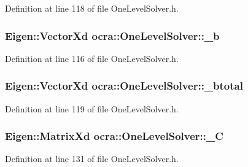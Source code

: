 Definition at line 118 of file One\+Level\+Solver.\+h.

\subsubsection[{\texorpdfstring{\+\_\+b}{_b}}]{\setlength{\rightskip}{0pt plus 5cm}Eigen\+::\+Vector\+Xd ocra\+::\+One\+Level\+Solver\+::\+\_\+b\hspace{0.3cm}{\ttfamily [protected]}}\hypertarget{classocra_1_1OneLevelSolver_a3c1c1c408757dad2c9f4256ceb7340d2}{}\label{classocra_1_1OneLevelSolver_a3c1c1c408757dad2c9f4256ceb7340d2}


Definition at line 116 of file One\+Level\+Solver.\+h.

\subsubsection[{\texorpdfstring{\+\_\+btotal}{_btotal}}]{\setlength{\rightskip}{0pt plus 5cm}Eigen\+::\+Vector\+Xd ocra\+::\+One\+Level\+Solver\+::\+\_\+btotal\hspace{0.3cm}{\ttfamily [protected]}}\hypertarget{classocra_1_1OneLevelSolver_a6ac65183fc93ea82d7e72fd4aae1422b}{}\label{classocra_1_1OneLevelSolver_a6ac65183fc93ea82d7e72fd4aae1422b}


Definition at line 119 of file One\+Level\+Solver.\+h.

\subsubsection[{\texorpdfstring{\+\_\+C}{_C}}]{\setlength{\rightskip}{0pt plus 5cm}Eigen\+::\+Matrix\+Xd ocra\+::\+One\+Level\+Solver\+::\+\_\+C\hspace{0.3cm}{\ttfamily [protected]}}\hypertarget{classocra_1_1OneLevelSolver_aad5ebd6a765da03c843c6d63539e6450}{}\label{classocra_1_1OneLevelSolver_aad5ebd6a765da03c843c6d63539e6450}


Definition at line 131 of file One\+Level\+Solver.\+h.

